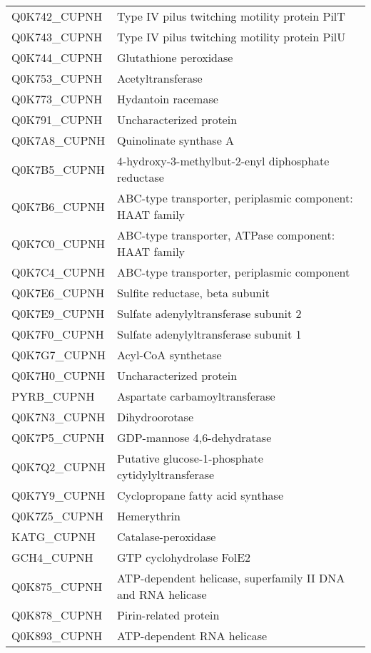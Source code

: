 \begin{center}
\begin{longtable}{ l l }
Q0K742\_CUPNH & Type IV pilus twitching motility protein PilT \\ [0.5ex]
Q0K743\_CUPNH & Type IV pilus twitching motility protein PilU \\ [0.5ex]
Q0K744\_CUPNH & Glutathione peroxidase \\ [0.5ex]
Q0K753\_CUPNH & Acetyltransferase \\ [0.5ex]
Q0K773\_CUPNH & Hydantoin racemase \\ [0.5ex]
Q0K791\_CUPNH & Uncharacterized protein \\ [0.5ex]
Q0K7A8\_CUPNH & Quinolinate synthase A \\ [0.5ex]
Q0K7B5\_CUPNH & 4-hydroxy-3-methylbut-2-enyl diphosphate reductase \\ [0.5ex]
Q0K7B6\_CUPNH & ABC-type transporter, periplasmic component: HAAT family \\ [0.5ex]
Q0K7C0\_CUPNH & ABC-type transporter, ATPase component: HAAT family \\ [0.5ex]
Q0K7C4\_CUPNH & ABC-type transporter, periplasmic component \\ [0.5ex]
Q0K7E6\_CUPNH & Sulfite reductase, beta subunit \\ [0.5ex]
Q0K7E9\_CUPNH & Sulfate adenylyltransferase subunit 2 \\ [0.5ex]
Q0K7F0\_CUPNH & Sulfate adenylyltransferase subunit 1 \\ [0.5ex]
Q0K7G7\_CUPNH & Acyl-CoA synthetase \\ [0.5ex]
Q0K7H0\_CUPNH & Uncharacterized protein \\ [0.5ex]
PYRB\_CUPNH & Aspartate carbamoyltransferase \\ [0.5ex]
Q0K7N3\_CUPNH & Dihydroorotase \\ [0.5ex]
Q0K7P5\_CUPNH & GDP-mannose 4,6-dehydratase \\ [0.5ex]
Q0K7Q2\_CUPNH & Putative glucose-1-phosphate cytidylyltransferase \\ [0.5ex]
Q0K7Y9\_CUPNH & Cyclopropane fatty acid synthase \\ [0.5ex]
Q0K7Z5\_CUPNH & Hemerythrin \\ [0.5ex]
KATG\_CUPNH & Catalase-peroxidase \\ [0.5ex]
GCH4\_CUPNH & GTP cyclohydrolase FolE2 \\ [0.5ex]
Q0K875\_CUPNH & ATP-dependent helicase, superfamily II DNA and RNA helicase \\ [0.5ex]
Q0K878\_CUPNH & Pirin-related protein \\ [0.5ex]
Q0K893\_CUPNH & ATP-dependent RNA helicase \\ [0.5ex]

\end{longtable}
\end{center}
